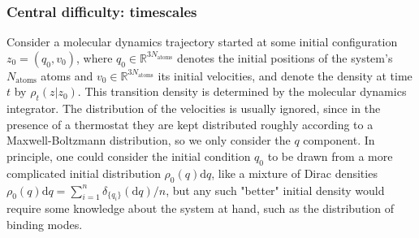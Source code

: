 %
%
%


\subsubsection{Central difficulty: timescales}\label{sec:timescales}

Consider a molecular dynamics trajectory started at some initial configuration $z_0 = (q_0, v_0)$, where $q_0 \in \mathbb{R}^{3 N_{\mathrm{atoms}}}$ denotes the initial positions of the system's $N_{\mathrm{atoms}}$ atoms and $v_0 \in \mathbb{R}^{3 N_{\mathrm{atoms}}}$ its initial velocities, and denote the density at time $t$ by $\rho_t(z|z_0)$. This transition density is determined by the molecular dynamics integrator. The distribution of the velocities is usually ignored, since in the presence of a thermostat they are kept distributed roughly according to a Maxwell-Boltzmann distribution, so we only consider the $q$ component. In principle, one could consider the initial condition $q_0$ to be drawn from a more complicated initial distribution $\rho_0(q) \mathrm{d}q$, like a mixture of Dirac densities $\rho_0(q) \mathrm{d}q = \sum_{i = 1}^n \delta_{\{ q_i \}}(\mathrm{d}q) / n$, but any such "better" initial density would require some knowledge about the system at hand, such as the distribution of binding modes. 

